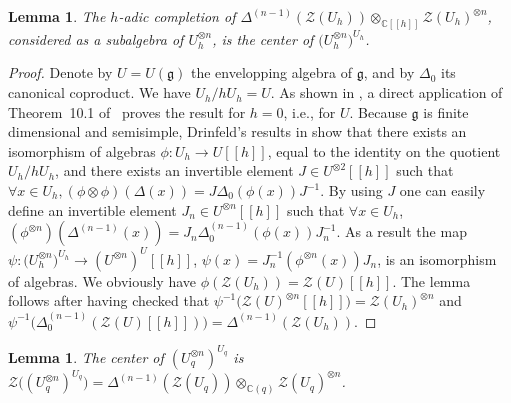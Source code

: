 \documentclass[pdftex]{sigma}%
\numberwithin{equation}{section}
\numberwithin{figure}{section}
\newtheorem{lem}[teo]{Lemma}
\begin{document}
\begin{lem} \label{centerh-n}
The $h$-adic completion of $\Delta^{(n-1)}(\mathcal{Z}(U_h))\otimes_{{\mathbb C}[[h]]}\mathcal{Z}(U_h)^{\otimes n}$, considered as a subalgebra of $U_{h}^{\otimes n}$, is the center of $\big(U_{h}^{\otimes n}\big)^{U_h}$.
\end{lem}

\begin{proof}
Denote by $U = U(\mathfrak g)$ the envelopping algebra of ${\mathfrak g}$, and by $\Delta_0$ its canonical coproduct. We have $U_h / h U_h=U$.
As shown in \cite[Lemma 3.10]{RY}, a direct application of Theorem~10.1 of~\cite{Knop} proves the result for $h =0$, i.e., for $U$. Because ${\mathfrak g}$ is finite dimensional and semisimple, Drinfeld's results in \cite{Dr,Dr1} show that there exists an isomorphism of algebras $\phi\colon U_h \rightarrow U[[h]]$, equal to the identity on the quotient $U_h / h U_h$, and there exists an invertible element $J \in U^{\otimes 2}[[h]]$ such that $\forall x\in U_h, (\phi\otimes \phi)(\Delta(x))=J \Delta_0 (\phi(x)) J^{-1}$. By using $J$ one can easily define an invertible element $J_n \in U^{\otimes n}[[h]]$ such that $\forall x\in U_h$, $(\phi^{\otimes n})(\Delta^{(n-1)}(x))=J_n\Delta_0^{(n-1)} (\phi(x)) J_n^{-1}$. As a result the map $\psi\colon \big(U_{h}^{\otimes n}\big)^{U_h}\rightarrow (U^{\otimes n})^{U}[[h]]$, $\psi(x) = J_n^{-1}(\phi^{\otimes n}(x)) J_n$, is an isomorphism of algebras. We obviously have $\phi(\mathcal{Z}(U_h))=\mathcal{Z}(U)[[h]]$. The lemma follows after having checked that
$\psi^{-1}\big(\mathcal{Z}(U)^{\otimes n}[[h]]\big)=\mathcal{Z}(U_h)^{\otimes n}$ and $\psi^{-1}\big(\Delta_0^{(n-1)}(\mathcal{Z}(U)[[h]])\big)=\Delta^{(n-1)}(\mathcal{Z}(U_h))$.
\end{proof}

\begin{lem} %
The center of $(U_{q}^{\otimes n})^{U_q}$ is $\mathcal{Z}\big((U_{q}^{\otimes n})^{U_q}\big)=\Delta^{(n-1)}(\mathcal{Z}(U_q))\otimes_{{\mathbb C}(q)}\mathcal{Z}(U_q)^{\otimes n}$.
\end{lem}
\end{document}
